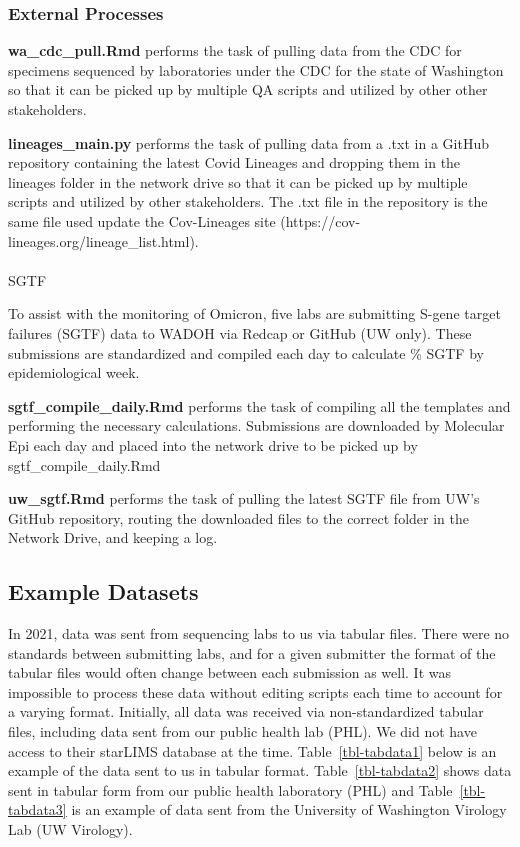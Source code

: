 \documentclass[
]{agujournal2019}
\makeatletter
\let\oldparagraph\paragraph
\renewcommand{\paragraph}{
    \@ifstar
      \xxxParagraphStar
      \xxxParagraphNoStar
  }
\newcommand{\xxxParagraphStar}[1]{\oldparagraph*{#1}\mbox{}}
\newcommand{\xxxParagraphNoStar}[1]{\oldparagraph{#1}\mbox{}}
\makeatother
\begin{document}
\subsubsection{External Processes}\label{external-processes}

\textbf{wa\_cdc\_pull.Rmd} performs the task of pulling data from the
CDC for specimens sequenced by laboratories under the CDC for the state
of Washington so that it can be picked up by multiple QA scripts and
utilized by other other stakeholders.

\textbf{lineages\_main.py} performs the task of pulling data from a .txt
in a GitHub repository containing the latest Covid Lineages and dropping
them in the lineages folder in the network drive so that it can be
picked up by multiple scripts and utilized by other stakeholders. The
.txt file in the repository is the same file used update the
Cov-Lineages site (https://cov-lineages.org/lineage\_list.html).

\paragraph{SGTF}\label{sgtf}

To assist with the monitoring of Omicron, five labs are submitting
S-gene target failures (SGTF) data to WADOH via Redcap or GitHub (UW
only). These submissions are standardized and compiled each day to
calculate \% SGTF by epidemiological week.

\textbf{sgtf\_compile\_daily.Rmd} performs the task of compiling all the
templates and performing the necessary calculations. Submissions are
downloaded by Molecular Epi each day and placed into the network drive
to be picked up by sgtf\_compile\_daily.Rmd

\textbf{uw\_sgtf.Rmd} performs the task of pulling the latest SGTF file
from UW's GitHub repository, routing the downloaded files to the correct
folder in the Network Drive, and keeping a log.

\subsection{Example Datasets}\label{example-datasets}

In 2021, data was sent from sequencing labs to us via tabular files.
There were no standards between submitting labs, and for a given
submitter the format of the tabular files would often change between
each submission as well\hspace{0pt}. It was impossible to process these
data without editing scripts each time to account for a varying format.
Initially, all data was received via non-standardized tabular files,
including data sent from our public health lab (PHL). We did not have
access to their starLIMS database at the time. Table~\ref{tbl-tabdata1}
below is an example of the data sent to us in tabular format.
Table~\ref{tbl-tabdata2} shows data sent in tabular form from our public
health laboratory (PHL) and Table~\ref{tbl-tabdata3} is an example of
data sent from the University of Washington Virology Lab (UW Virology).
\end{document}
